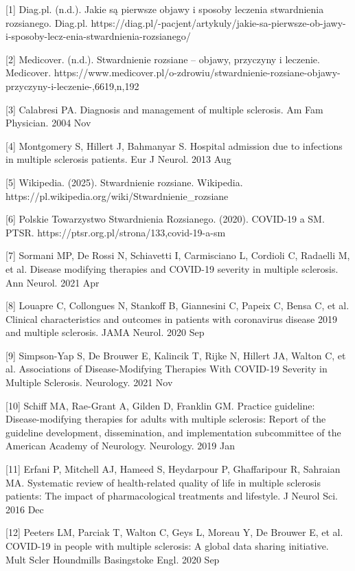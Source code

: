 \documentclass[a4paper,fleqn]{cas-dc}
\begin{document}
[1] Diag.pl. (n.d.). Jakie są pierwsze objawy i sposoby leczenia stwardnienia rozsianego. Diag.pl. https://diag.pl/-pacjent/artykuly/jakie-sa-pierwsze-ob-jawy-i-sposoby-lecz-enia-stwardnienia-rozsianego/

[2] Medicover. (n.d.). Stwardnienie rozsiane – objawy, przyczyny i leczenie. Medicover. https://www.medicover.pl/o-zdrowiu/stwardnienie-rozsiane-objawy-przyczyny-i-leczenie-,6619,n,192

[3] Calabresi PA. Diagnosis and management of multiple sclerosis. Am Fam Physician. 2004 Nov

[4] Montgomery S, Hillert J, Bahmanyar S. Hospital admission due to infections in multiple sclerosis patients. Eur J Neurol. 2013 Aug

[5] Wikipedia. (2025). Stwardnienie rozsiane. Wikipedia. https://pl.wikipedia.org/wiki/Stwardnienie\_rozsiane

[6] Polskie Towarzystwo Stwardnienia Rozsianego. (2020). COVID-19 a SM. PTSR. https://ptsr.org.pl/strona/133,covid-19-a-sm

[7] Sormani MP, De Rossi N, Schiavetti I, Carmisciano L, Cordioli C, Radaelli M, et al. Disease modifying therapies and COVID-19 severity in multiple sclerosis. Ann Neurol. 2021 Apr

[8] Louapre C, Collongues N, Stankoff B, Giannesini C, Papeix C, Bensa C, et al. Clinical characteristics and outcomes in patients with coronavirus disease 2019 and multiple sclerosis. JAMA Neurol. 2020 Sep

[9] Simpson-Yap S, De Brouwer E, Kalincik T, Rijke N, Hillert JA, Walton C, et al. Associations of Disease-Modifying Therapies With COVID-19 Severity in Multiple Sclerosis. Neurology. 2021 Nov

[10] Schiff MA, Rae-Grant A, Gilden D, Franklin GM. Practice guideline: Disease-modifying therapies for adults with multiple sclerosis: Report of the guideline development, dissemination, and implementation subcommittee of the American Academy of Neurology. Neurology. 2019 Jan

[11] Erfani P, Mitchell AJ, Hameed S, Heydarpour P, Ghaffaripour R, Sahraian MA. Systematic review of health-related quality of life in multiple sclerosis patients: The impact of pharmacological treatments and lifestyle. J Neurol Sci. 2016 Dec

[12] Peeters LM, Parciak T, Walton C, Geys L, Moreau Y, De Brouwer E, et al. COVID-19 in people with multiple sclerosis: A global data sharing initiative. Mult Scler Houndmills Basingstoke Engl. 2020 Sep
\end{document}
